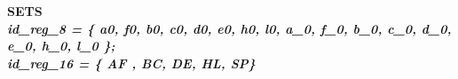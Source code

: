 \documentclass[a4paper]{llncs}
\begin{document}
\begin{sloppypar}

	\bf SETS\\
\hspace*{0.10in}\it id\_reg\_8 \rm = \rm \{ \it a0\rm, \it f0\rm, \it b0\rm, \it
c0\rm, \it d0\rm, \it e0\rm, \it h0\rm, \it l0\rm, \it a\_0\rm,  \it f\_0\rm,
\it b\_0\rm, \it c\_0\rm, \it d\_0\rm, \it e\_0\rm, \it h\_0\rm, \it l\_0 \rm
\};\\ \hspace*{0.10in}\it id\_reg\_16 \rm = \rm \{  \it AF \rm, \it BC\rm, \it
DE\rm, \it HL\rm, \it SP\rm\}
	

\end{sloppypar}

%
\end{document}
